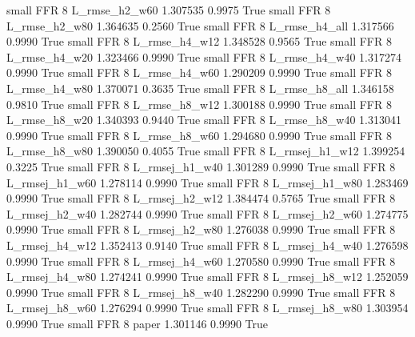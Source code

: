      small      FFR                 8  L_rmse_h2_w60   1.307535      0.9975    True
     small      FFR                 8  L_rmse_h2_w80   1.364635      0.2560    True
     small      FFR                 8  L_rmse_h4_all   1.317566      0.9990    True
     small      FFR                 8  L_rmse_h4_w12   1.348528      0.9565    True
     small      FFR                 8  L_rmse_h4_w20   1.323466      0.9990    True
     small      FFR                 8  L_rmse_h4_w40   1.317274      0.9990    True
     small      FFR                 8  L_rmse_h4_w60   1.290209      0.9990    True
     small      FFR                 8  L_rmse_h4_w80   1.370071      0.3635    True
     small      FFR                 8  L_rmse_h8_all   1.346158      0.9810    True
     small      FFR                 8  L_rmse_h8_w12   1.300188      0.9990    True
     small      FFR                 8  L_rmse_h8_w20   1.340393      0.9440    True
     small      FFR                 8  L_rmse_h8_w40   1.313041      0.9990    True
     small      FFR                 8  L_rmse_h8_w60   1.294680      0.9990    True
     small      FFR                 8  L_rmse_h8_w80   1.390050      0.4055    True
     small      FFR                 8 L_rmsej_h1_w12   1.399254      0.3225    True
     small      FFR                 8 L_rmsej_h1_w40   1.301289      0.9990    True
     small      FFR                 8 L_rmsej_h1_w60   1.278114      0.9990    True
     small      FFR                 8 L_rmsej_h1_w80   1.283469      0.9990    True
     small      FFR                 8 L_rmsej_h2_w12   1.384474      0.5765    True
     small      FFR                 8 L_rmsej_h2_w40   1.282744      0.9990    True
     small      FFR                 8 L_rmsej_h2_w60   1.274775      0.9990    True
     small      FFR                 8 L_rmsej_h2_w80   1.276038      0.9990    True
     small      FFR                 8 L_rmsej_h4_w12   1.352413      0.9140    True
     small      FFR                 8 L_rmsej_h4_w40   1.276598      0.9990    True
     small      FFR                 8 L_rmsej_h4_w60   1.270580      0.9990    True
     small      FFR                 8 L_rmsej_h4_w80   1.274241      0.9990    True
     small      FFR                 8 L_rmsej_h8_w12   1.252059      0.9990    True
     small      FFR                 8 L_rmsej_h8_w40   1.282290      0.9990    True
     small      FFR                 8 L_rmsej_h8_w60   1.276294      0.9990    True
     small      FFR                 8 L_rmsej_h8_w80   1.303954      0.9990    True
     small      FFR                 8          paper   1.301146      0.9990    True
